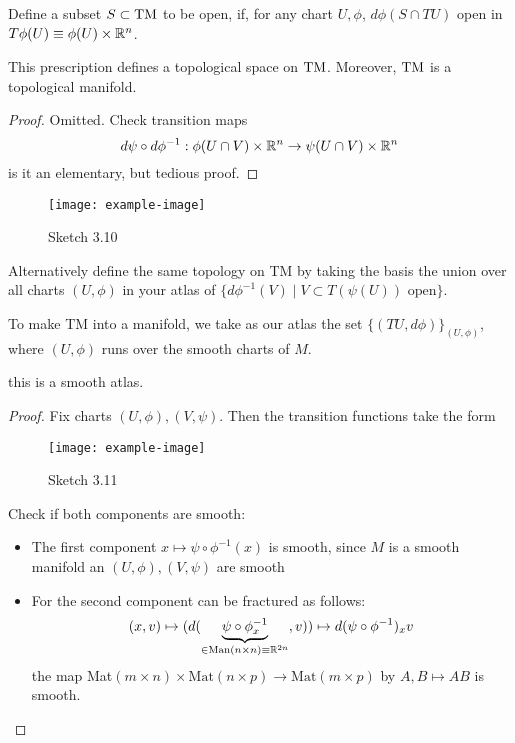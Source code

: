 Define a subset \(S\subset {\text{TM}}\) to be open, if, for any chart \(U,\phi\), \(d\phi(S\cap TU)\) open in \(T\phi(U)\equiv \phi(U)\times \mathbb{R}^n\). %
\begin{lemma}\label{lem:2.10}
    This prescription defines a topological space on \({\text{TM}}\). Moreover, \({\text{TM}}\) is a topological manifold.
\end{lemma}

\begin{proof}
    Omitted. Check transition maps 
    \[d\psi\circ d\phi^{-1}:\phi(U\cap V)\times \mathbb{R}^n\to \psi(U\cap V)\times \mathbb{R}^n\]
    is it an elementary, but tedious proof. 
\end{proof}

\begin{figure}[H] %
    \centering
    \texttt{[image: example-image]}
    \caption{Sketch 3.10}
\end{figure}

\begin{remark}
    Alternatively define the same topology on TM by taking the basis the union over all charts \((U,\phi)\) in your atlas 
    of \(\{d\phi^{-1}(V)\mid V\subset T(\psi(U)) \text{ open}\}\).
\end{remark}

To make TM into a  manifold, we take as our atlas the set \(\{(TU,d\phi)\}_{(U,\phi)}\),
where \((U,\phi)\) runs over the smooth charts of \(M\). 

\begin{lemma}\label{lem:3.11}
    this is a smooth atlas. 
\end{lemma}

\begin{proof}
    Fix charts \((U,\phi),(V,\psi)\). Then the transition functions take the form 
    \begin{figure}[H]
        \centering
        \texttt{[image: example-image]}
        \caption{Sketch 3.11}
    \end{figure}
    Check if both components are smooth:
    \begin{itemize}
        \item The first component \(x\mapsto \psi\circ\phi^{-1}(x)\) is smooth, since \(M\) is a smooth manifold an \((U,\phi),(V,\psi)\) are smooth  
        \item For the second component can be fractured as follows: \[(x,v)\mapsto (d(\underbrace{\psi\circ\phi^{-1}_x}_{\in\text{Man}(n\times n)\equiv\mathbb{R}^{2n}},v))\mapsto d(\psi\circ\phi^{-1})_xv\] 
         the map Mat\((m\times n)\times \text{Mat}(n\times p)\to \text{Mat}(m\times p)\) by \(A,B\mapsto AB\) is smooth. \qedhere
    \end{itemize}
\end{proof}

